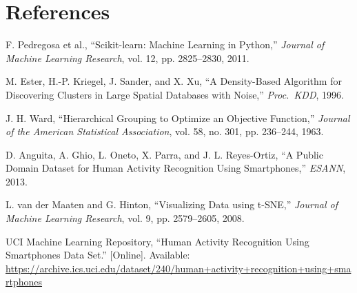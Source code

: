 \documentclass[11pt,a4paper]{article}
\begin{document}
\section{References}
\begin{enumerate}[label={[\arabic*]}]
\item F. Pedregosa et al., ``Scikit-learn: Machine Learning in Python,'' \emph{Journal of Machine Learning Research}, vol. 12, pp. 2825--2830, 2011.
\item M. Ester, H.-P. Kriegel, J. Sander, and X. Xu, ``A Density-Based Algorithm for Discovering Clusters in Large Spatial Databases with Noise,'' \emph{Proc.\ KDD}, 1996.
\item J. H. Ward, ``Hierarchical Grouping to Optimize an Objective Function,'' \emph{Journal of the American Statistical Association}, vol. 58, no. 301, pp. 236--244, 1963.
\item D. Anguita, A. Ghio, L. Oneto, X. Parra, and J. L. Reyes-Ortiz, ``A Public Domain Dataset for Human Activity Recognition Using Smartphones,'' \emph{ESANN}, 2013.
\item L. van der Maaten and G. Hinton, ``Visualizing Data using t-SNE,'' \emph{Journal of Machine Learning Research}, vol. 9, pp. 2579--2605, 2008.
\item UCI Machine Learning Repository, ``Human Activity Recognition Using Smartphones Data Set.'' [Online]. Available: \url{https://archive.ics.uci.edu/dataset/240/human+activity+recognition+using+smartphones}
\end{enumerate}
\end{document}
